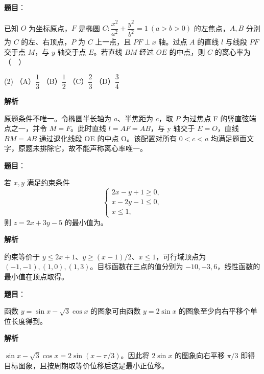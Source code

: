 \begin{answer}

\textbf{题目}：

已知 \(O\) 为坐标原点，\(F\) 是椭圆 \(C:\dfrac{x^2}{a^2}+\dfrac{y^2}{b^2}=1\ (a>b>0)\) 的左焦点，\(A,B\) 分别为 \(C\) 的左、右顶点，\(P\) 为 \(C\) 上一点，且 \(PF\perp x\) 轴。过点 \(A\) 的直线 \(l\) 与线段 \(PF\) 交于点 \(M\)，与 \(y\) 轴交于点 \(E\)。若直线 \(BM\) 经过 \(OE\) 的中点，则 \(C\) 的离心率为（　）

\begin{gkopts}(2)
\task （A）\(\dfrac13\)
\task （B）\(\dfrac12\)
\task （C）\(\dfrac23\)
\task （D）\(\dfrac34\)
\end{gkopts}

\textbf{解析}

原题条件不唯一。令椭圆半长轴为 \(a\)、半焦距为 \(c\)，取 \(P\) 为过焦点 F 的竖直弦端点之一，并令 \(M=F\)。此时直线 \(l=AF=AB\)，与 y 轴交于 \(E=O\)，直线 \(BM=AB\) 通过退化线段 OE 的中点 O。该配置对所有 \(0<c<a\) 均满足题面文字，原题未排除它，故不能声称离心率唯一。


\end{answer}
\begin{answer}

\textbf{题目}：

若 \(x,y\) 满足约束条件
\nopagebreak[4]
\[
\begin{cases}
2x-y+1\geq0,\\
x-2y-1\leq0,\\
x\leq1,
\end{cases}
\]
则 \(z=2x+3y-5\) 的最小值为\gkblank{}。

\textbf{解析}

约束等价于 \(y\le2x+1\)、\(y\ge(x-1)/2\)、\(x\le1\)，可行域顶点为 \((-1,-1),(1,0),(1,3)\)。目标函数在三点的值分别为 \(-10,-3,6\)，线性函数的最小值在顶点取得。


\end{answer}
\begin{answer}

\textbf{题目}：

函数 \(y=\sin x-\sqrt3\cos x\) 的图象可由函数 \(y=2\sin x\) 的图象至少向右平移\gkblank{}个单位长度得到。

\textbf{解析}

\(\sin x-\sqrt3\cos x=2\sin(x-\pi/3)\)。因此将 \(2\sin x\) 的图象向右平移 \(\pi/3\) 即得目标图象，且按周期取等价位移后这是最小正位移。


\end{answer}
